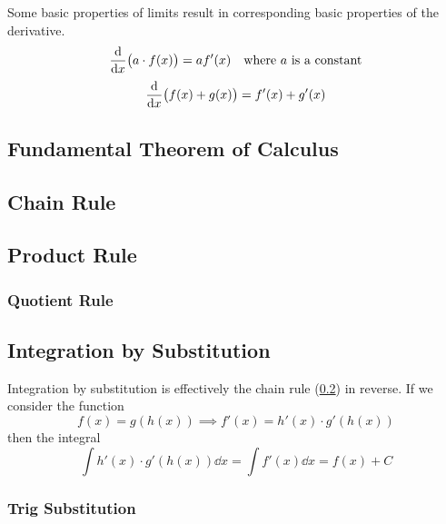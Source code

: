 \documentclass[fleqn,a4paper,11pt]{article}
\begin{document}
    Some basic properties of limits result in corresponding basic properties of
    the derivative.
    \begin{equation*}
    \dv{x}(a \cdot f(x)) = af'(x) \quad \text{where \(a\) is a constant}
    \end{equation*}
    \begin{equation*}
    \dv{x}(f(x) + g(x)) = f'(x) + g'(x)
    \end{equation*}

    \subsection{Fundamental Theorem of Calculus} \label{sec_calc_FTC}

    \subsection{Chain Rule} \label{sec_calc_chain}

    \subsection{Product Rule} \label{sec_calc_product}

    \subsubsection{Quotient Rule} \label{sec_calc_quotient}

    \subsection{Integration by Substitution} \label{sec_calc_substitution}

    Integration by substitution is effectively the chain rule
    (\ref{sec_calc_chain}) in reverse. If we consider the function
    \begin{equation*}
    f(x) = g(h(x)) \implies f'(x) = h'(x) \cdot g'(h(x))
    \end{equation*}
    then the integral
    \begin{equation}
    \int h'(x) \cdot g'(h(x)) \dd{x} = \int f'(x) \dd{x} = f(x) + C
    \end{equation}

    \subsubsection{Trig Substitution} \label{sec_calc_trig_substitution}
\end{document}
